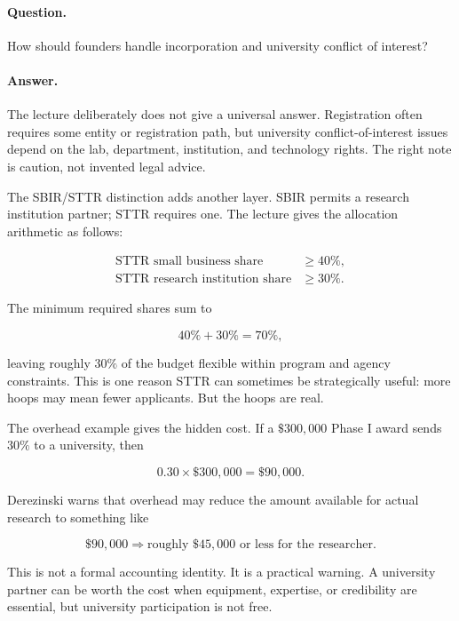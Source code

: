 \paragraph{Question.}
How should founders handle incorporation and university conflict of interest?

\paragraph{Answer.}
The lecture deliberately does not give a universal answer. Registration often requires some entity or registration path, but university conflict-of-interest issues depend on the lab, department, institution, and technology rights. The right note is caution, not invented legal advice.

The SBIR/STTR distinction adds another layer. SBIR permits a research institution partner; STTR requires one. The lecture gives the allocation arithmetic as follows:

\begin{align}
\text{STTR small business share} &\ge 40\%,\\
\text{STTR research institution share} &\ge 30\%.
\end{align}

The minimum required shares sum to

\begin{equation}
40\%+30\%=70\%,
\end{equation}

leaving roughly \(30\%\) of the budget flexible within program and agency constraints. This is one reason STTR can sometimes be strategically useful: more hoops may mean fewer applicants. But the hoops are real.

The overhead example gives the hidden cost. If a \(\$300{,}000\) Phase I award sends \(30\%\) to a university, then

\begin{equation}
0.30\times \$300{,}000=\$90{,}000.
\end{equation}

Derezinski warns that overhead may reduce the amount available for actual research to something like

\begin{equation}
\$90{,}000
\Rightarrow
\text{roughly }\$45{,}000\text{ or less for the researcher.}
\end{equation}

This is not a formal accounting identity. It is a practical warning. A university partner can be worth the cost when equipment, expertise, or credibility are essential, but university participation is not free.

